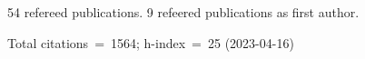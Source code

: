 54 refereed publications. 9 refeered publications as first author.

Total citations~=~1564; h-index~=~25 (2023-04-16)